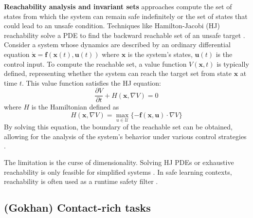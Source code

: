 \documentclass[Afour,sageh,times]{template/sagej}
\newcommand{\suggest}[1]{{\color{olive} (#1)}}
\begin{document}
\textbf{Reachability analysis and invariant sets} approaches compute the set of states from which the system can remain safe indefinitely or the set of states that could lead to an unsafe condition. Techniques like Hamilton-Jacobi (HJ) reachability solve a PDE to find the backward reachable set of an unsafe target \citep{mitchell2005time, bansal2017hamilton}. Consider a system whose dynamics are described by an ordinary differential equation
    $ \dot{\boldsymbol{x}} = \boldsymbol{f}(\boldsymbol{x}(t), \boldsymbol{u}(t)) $
where $\boldsymbol{x}$ is the system's states, $\boldsymbol{u}(t)$ is the control input.
To compute the reachable set, a value function $V(\boldsymbol{x}, t)$ is typically defined, representing whether the system can reach the target set from state $\boldsymbol{x}$ at time $t$. This value function satisfies the HJ equation:
\begin{equation}
    \frac{\partial V}{\partial t} + H(\boldsymbol{x}, \nabla{V}) = 0
\end{equation}
where $H$ is the Hamiltonian defined as
\begin{equation}
    H(\boldsymbol{x}, \nabla{V}) = \max_{u \in \mathcal{U}}\{-\boldsymbol{f(x, u)} \cdot \nabla{V}\}
\end{equation}
By solving this equation, the boundary of the reachable set can be obtained, allowing for the analysis of the system's behavior under various control strategies \citep{mballo2025hamilton, choi2023forward, liu2024hamilton}.

The limitation is the curse of dimensionality. Solving HJ PDEs or exhaustive reachability is only feasible for simplified systems \citep{darbon2016algorithms, bansal2021deepreach, ganai2023iterative}. In safe learning contexts, reachability is often used as a runtime safety filter \citep{liu2025reachable, Shao2021RTS, selim2022safe, kochdumper2023provably, suh2025dexterous}. 


\subsection{\suggest{Gokhan} Contact-rich tasks}\label{sec:tasks-review}
\end{document}
